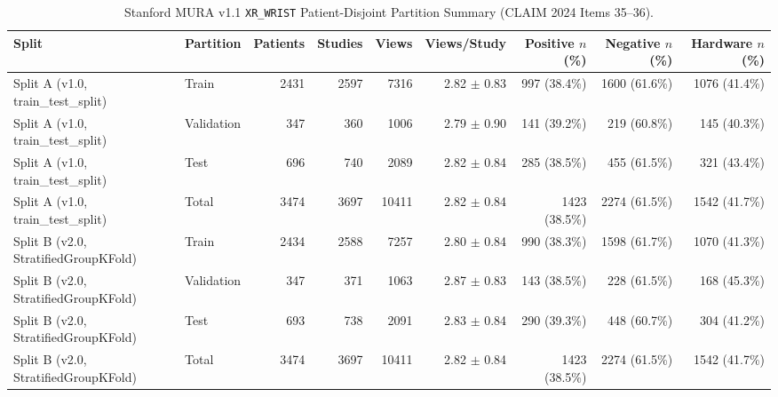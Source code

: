 \begin{table}[t]
\centering
\caption{Stanford MURA v1.1 \texttt{XR\_WRIST} Patient-Disjoint Partition Summary (CLAIM 2024 Items 35--36).}
\label{tab:dataset_partitions}
\begin{tabular}{llrrrrrrr}
\toprule
Split & Partition & Patients & Studies & Views & Views/Study & Positive $n$ (\%) & Negative $n$ (\%) & Hardware $n$ (\%) \\
\midrule
Split A (v1.0, train\_test\_split) & Train & 2431 & 2597 & 7316 & 2.82 $\pm$ 0.83 & 997 (38.4\%) & 1600 (61.6\%) & 1076 (41.4\%) \\
Split A (v1.0, train\_test\_split) & Validation & 347 & 360 & 1006 & 2.79 $\pm$ 0.90 & 141 (39.2\%) & 219 (60.8\%) & 145 (40.3\%) \\
Split A (v1.0, train\_test\_split) & Test & 696 & 740 & 2089 & 2.82 $\pm$ 0.84 & 285 (38.5\%) & 455 (61.5\%) & 321 (43.4\%) \\
Split A (v1.0, train\_test\_split) & Total & 3474 & 3697 & 10411 & 2.82 $\pm$ 0.84 & 1423 (38.5\%) & 2274 (61.5\%) & 1542 (41.7\%) \\
\midrule
Split B (v2.0, StratifiedGroupKFold) & Train & 2434 & 2588 & 7257 & 2.80 $\pm$ 0.84 & 990 (38.3\%) & 1598 (61.7\%) & 1070 (41.3\%) \\
Split B (v2.0, StratifiedGroupKFold) & Validation & 347 & 371 & 1063 & 2.87 $\pm$ 0.83 & 143 (38.5\%) & 228 (61.5\%) & 168 (45.3\%) \\
Split B (v2.0, StratifiedGroupKFold) & Test & 693 & 738 & 2091 & 2.83 $\pm$ 0.84 & 290 (39.3\%) & 448 (60.7\%) & 304 (41.2\%) \\
Split B (v2.0, StratifiedGroupKFold) & Total & 3474 & 3697 & 10411 & 2.82 $\pm$ 0.84 & 1423 (38.5\%) & 2274 (61.5\%) & 1542 (41.7\%) \\
\bottomrule
\end{tabular}
\end{table}